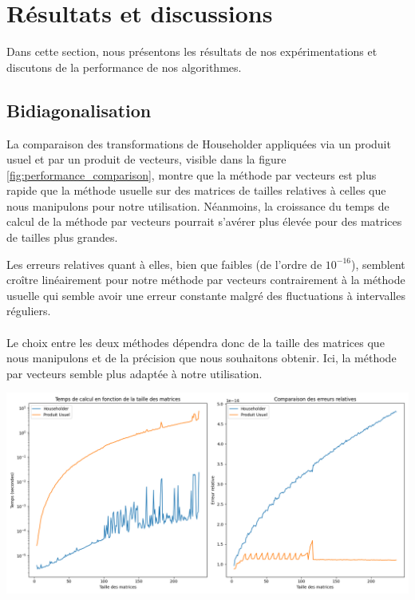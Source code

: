 \documentclass{article}
\begin{document}
\section{Résultats et discussions}
Dans cette section, nous présentons les résultats de nos expérimentations et discutons de la performance de nos algorithmes.

\subsection{Bidiagonalisation}
La comparaison des transformations de Householder appliquées via un produit usuel et par un produit de vecteurs, visible dans la figure \ref{fig:performance_comparison}, montre que la méthode par vecteurs est plus rapide que la méthode usuelle sur des matrices de tailles relatives à celles que nous manipulons pour notre utilisation. Néanmoins, la croissance du temps de calcul de la méthode par vecteurs pourrait s'avérer plus élevée pour des matrices de tailles plus grandes.\\
\begin{minipage}{0.37\textwidth}
  Les erreurs relatives quant à elles, bien que faibles (de l'ordre de $10^{-16}$), semblent croître linéairement pour notre méthode par vecteurs contrairement à la méthode usuelle qui semble avoir une erreur constante malgré des fluctuations à intervalles réguliers.\\ \\
  Le choix entre les deux méthodes dépendra donc de la taille des matrices que nous manipulons et de la précision que nous souhaitons obtenir. Ici, la méthode par vecteurs semble plus adaptée à notre utilisation.
  \end{minipage}
\hfill
\begin{minipage}{0.6\textwidth}
  \centering
  \includegraphics[width=\textwidth, trim=0.5cm 0 0 0, clip]{householder_comparaison.png}
  \label{fig:performance_comparison}
\end{minipage}
\end{document}
